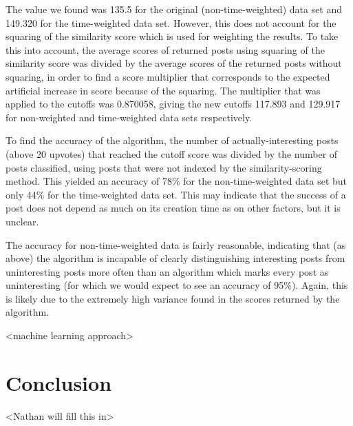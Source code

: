 \documentclass{acm_proc_article-sp}
\begin{document}
The value we found was 135.5 for the original (non-time-weighted) data set and 149.320 for the time-weighted data set.
However, this does not account for the squaring of the similarity score which is used for weighting the results.  To
take this into account, the average scores of returned posts using squaring of the similarity score was divided by the average
scores of the returned posts without squaring, in order to find a score multiplier that corresponds to the 
expected artificial increase in score because of the squaring.  The multiplier that was applied to the cutoffs
was 0.870058, giving the new cutoffs 117.893 and 129.917 for non-weighted and time-weighted data sets respectively.

To find the accuracy of the algorithm, the number of actually-interesting posts (above 20 upvotes) that reached
the cutoff score was divided by the number of posts classified, using posts that were not indexed by the
similarity-scoring method.  This yielded an accuracy of 78\% for the non-time-weighted data set but only 44\% for
the time-weighted data set.  This may indicate that the success of a post does not depend as much on its creation
time as on other factors, but it is unclear.

The accuracy for non-time-weighted data is fairly reasonable, indicating that (as above) the algorithm is incapable
of clearly distinguishing interesting posts from uninteresting posts more often than an algorithm which marks
every post as uninteresting (for which we would expect to see an accuracy of 95\%).
Again, this is likely due to the extremely high variance found in the scores returned by the
algorithm.


<machine learning approach>



\section{Conclusion}

<Nathan will fill this in>

%

%
%


\end{document}
